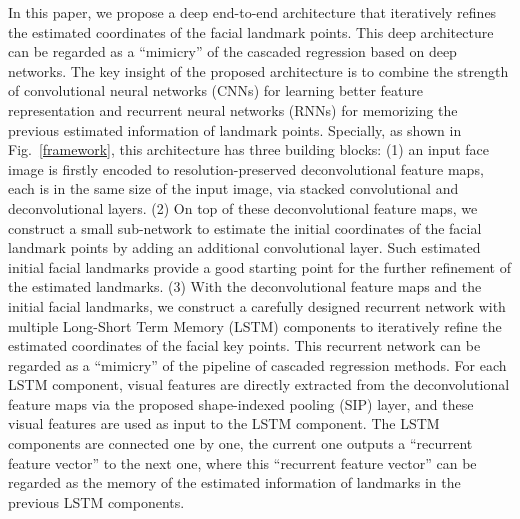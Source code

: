 \documentclass[journal]{IEEEtran}
\begin{document}
In this paper, we propose a deep end-to-end architecture that iteratively refines the estimated coordinates of the facial landmark points. This deep architecture can be regarded as a ``mimicry'' of the cascaded regression based on deep networks. The key insight of the proposed architecture is to combine the strength of convolutional neural networks (CNNs) for learning better feature representation and recurrent neural networks (RNNs) for memorizing the previous estimated information of landmark points. Specially, as shown in Fig.~\ref{framework},  this architecture has three building blocks: (1) an input face image is firstly encoded to resolution-preserved deconvolutional feature maps, each is in the same size of the input image, via stacked convolutional and deconvolutional layers. (2) On top of these deconvolutional feature maps, we construct a small sub-network to estimate the initial coordinates of the facial landmark points by adding an additional convolutional layer. Such estimated initial facial landmarks provide a good starting point for the further refinement of the estimated landmarks. (3) With the deconvolutional feature maps and the initial facial landmarks, we construct a carefully designed recurrent network with multiple Long-Short Term Memory (LSTM) components to iteratively refine the estimated coordinates of the facial key points. This recurrent network can be regarded as a ``mimicry'' of the pipeline of cascaded regression methods. For each LSTM component, visual features are directly extracted from the deconvolutional feature maps via the proposed shape-indexed pooling (SIP) layer, and these visual features are used as input to the LSTM component. The LSTM components are connected one by one, the current one outputs a ``recurrent feature vector'' to the next one, where this ``recurrent feature vector'' can be regarded as the memory of the estimated information of landmarks in the previous LSTM components.
\end{document}
